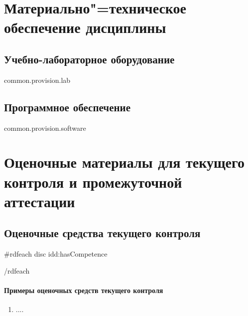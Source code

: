 \documentclass[12pt]{scrartcl}
\newcommand{\rdf}[2]{#2}
\newenvironment{rdfctx}[1]{}{}
\begin{document}
\section{Материально"=техническое обеспечение дисциплины}

\subsection{Учебно-лабораторное оборудование}

{{common.provision.lab}}

\subsection{Программное обеспечение}

{{common.provision.software}}

\section{Оценочные материалы для текущего контроля и
промежуточной аттестации}


\subsection{Оценочные средства текущего контроля}
{{#rdfeach disc idd:hasCompetence}}


{{/rdfeach}}




\paragraph{Примеры оценочных средств текущего контроля}

\begin{rdfctx}{\rdfsetctx{list}{syll wpdd:itemList !wpdd:ExampleList !wpdd:CurrentAttestation !wpdd:ItemList}}
\begin{enumerate}
\item \rdf{list ^schema:member !wpdd:ListItem !wpdd:Example}{....}
\end{enumerate}
\end{rdfctx}
\end{document}
